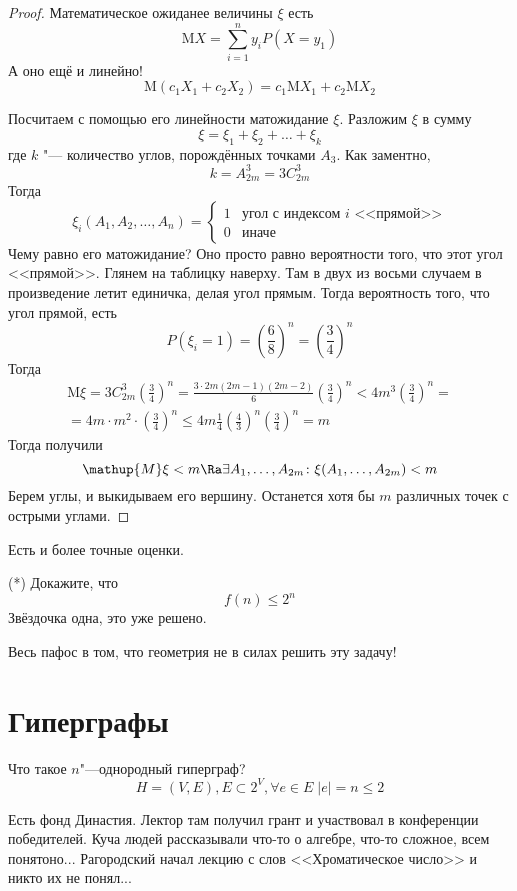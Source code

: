\begin{proof}
	Математическое ожиданее величины $\xi$ есть
	\[ \mathup{M}X = \sum_{i=1}^n y_i P(X = y_1) \]
	А оно ещё и линейно!
	\[ \mathup{M}(c_1X_1 + c_2X_2) = c_1\mathup{M}X_1 + c_2\mathup{M}X_2 \]

	Посчитаем с помощью его линейности матожидание $\xi$. Разложим $\xi$ в сумму
	\[ \xi = \xi_1 + \xi_2 + \dots + \xi_k \]
	где $k$ "--- количество углов, порождённых точками $A_3$. Как заментно,
	\[ k = A_{2m}^3 = 3C_{2m}^3 \]
	Тогда
	\[ \xi_i(A_1, A_2, \dots, A_n) = \begin{cases} 1 & \text{угол с индексом $i$ <<прямой>>} \\ 0 & \text{иначе}\end{cases} \]
	Чему равно его матожидание?
	Оно просто равно вероятности того, что этот угол <<прямой>>.
	Глянем на таблицку наверху.
	Там в двух из восьми случаем в произведение летит единичка, делая угол прямым. Тогда вероятность того, что угол прямой, есть
	\[ P(\xi_i = 1) = \left(\frac68\right)^n = \left(\frac34\right)^n \]
	Тогда
	\begin{gather*}
		\mathup{M}\xi = 3C_{2m}^3 \left(\frac34\right)^n = \frac{3\cdot2m(2m-1)(2m-2)}6 \left(\frac34\right)^n < 4m^3 \left(\frac34 \right)^n = \\
		= 4m \cdot m^2 \cdot \left(\frac34\right)^n \le 4m \frac14 \left(\frac43\right)^n \left(\frac34\right)^n = m
	\end{gather*}
	Тогда получили
	\[ \mathup{M}\xi < m \Ra \exists A_1, \dots, A_{2m}\colon \xi(A_1, \dots, A_{2m}) < m \]
	Берем углы, и выкидываем его вершину. Останется хотя бы $m$ различных точек с острыми углами.
\end{proof}

Есть и более точные оценки.

\begin{Exercise}
	(*) Докажите, что
	\[f(n) \leqslant 2^n \]
	Звёздочка одна, это уже решено.
\end{Exercise}

Весь пафос в том, что геометрия не в силах решить эту задачу!

\section{Гиперграфы}

Что такое $n$"---однородный гиперграф?
\[ H = (V, E), E \subset 2^V, \forall e \in E\; |e| = n \le 2 \]

\begin{Rem}
	Есть фонд Династия. Лектор там получил грант и участвовал в конференции победителей. Куча людей рассказывали что-то о алгебре, что-то сложное, всем понятоно... Рагородский начал лекцию с слов <<Хроматическое число>> и никто их не понял...
\end{Rem}

